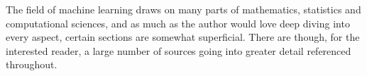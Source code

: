 \documentclass[../../thesis.tex]{subfiles}
\begin{document}
The field of machine learning draws on many parts of mathematics, statistics and computational sciences, and as much as the author would love deep diving into every aspect, certain sections are somewhat superficial. There are though, for the interested reader, a large number of sources going into greater detail referenced throughout. \newline











\end{document}
